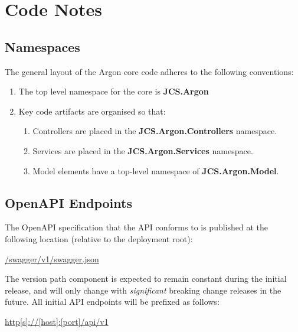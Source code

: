 \documentclass{book}
\begin{document}
\section{Code Notes}
\subsection{Namespaces}
The general layout of the Argon core code adheres to the following conventions:
\begin{enumerate}
    \item The top level namespace for the core is \textbf{JCS.Argon}
    \item Key code artifacts are organised so that:
    \begin{enumerate}
        \item Controllers are placed in the \textbf{JCS.Argon.Controllers} namespace.
        \item Services are placed in the \textbf{JCS.Argon.Services} namespace.
        \item Model elements have a top-level namespace of \textbf{JCS.Argon.Model}.
    \end{enumerate}
\end{enumerate}
\subsection{OpenAPI Endpoints}
The OpenAPI specification that the API conforms to is published at the following location (relative to the deployment root):
\begin{center}
    \url{/swagger/v1/swagger.json}
\end{center}
The version path component is expected to remain constant during the initial release, and will only change with \textit{significant} breaking change releases in the future.
All initial API endpoints will be prefixed as follows:
\begin{center}
    \url{http[s]://[host]:[port]/api/v1}
\end{center}
\end{document}
